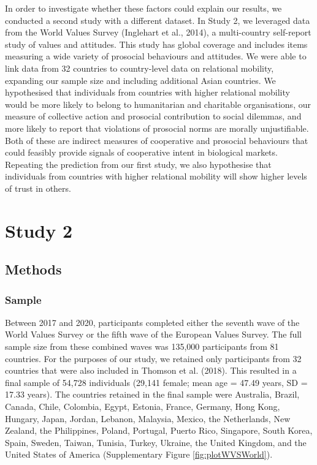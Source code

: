 \documentclass[
  man,floatsintext]{apa6}
\begin{document}
In order to investigate whether these factors could explain our results, we conducted a second study with a different dataset. In Study 2, we leveraged data from the World Values Survey (Inglehart et al., 2014), a multi-country self-report study of values and attitudes. This study has global coverage and includes items measuring a wide variety of prosocial behaviours and attitudes. We were able to link data from 32 countries to country-level data on relational mobility, expanding our sample size and including additional Asian countries. We hypothesised that individuals from countries with higher relational mobility would be more likely to belong to humanitarian and charitable organisations, our measure of collective action and prosocial contribution to social dilemmas, and more likely to report that violations of prosocial norms are morally unjustifiable. Both of these are indirect measures of cooperative and prosocial behaviours that could feasibly provide signals of cooperative intent in biological markets. Repeating the prediction from our first study, we also hypothesise that individuals from countries with higher relational mobility will show higher levels of trust in others.

\hypertarget{study-2}{%
\section{Study 2}\label{study-2}}

\hypertarget{methods-1}{%
\subsection{Methods}\label{methods-1}}

\hypertarget{sample-1}{%
\subsubsection{Sample}\label{sample-1}}

Between 2017 and 2020, participants completed either the seventh wave of the World Values Survey or the fifth wave of the European Values Survey. The full sample size from these combined waves was 135,000 participants from 81 countries. For the purposes of our study, we retained only participants from 32 countries that were also included in Thomson et al. (2018). This resulted in a final sample of 54,728 individuals (29,141 female; mean age = 47.49 years, SD = 17.33 years). The countries retained in the final sample were Australia, Brazil, Canada, Chile, Colombia, Egypt, Estonia, France, Germany, Hong Kong, Hungary, Japan, Jordan, Lebanon, Malaysia, Mexico, the Netherlands, New Zealand, the Philippines, Poland, Portugal, Puerto Rico, Singapore, South Korea, Spain, Sweden, Taiwan, Tunisia, Turkey, Ukraine, the United Kingdom, and the United States of America (Supplementary Figure \ref{fig:plotWVSWorld}).
\end{document}
